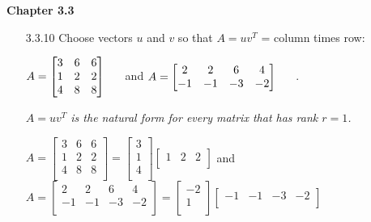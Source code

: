 \documentclass[10pt,twoside,reqno]{article}
\begin{document}
\textbf{Chapter 3.3}
\begin{enumerate}
\item[3.3.10] Choose vectors $u$ and $v$ so that $A = uv^T$ = column times row: \\
\begin{center}
$
$$
A =
\begin{bmatrix}
3&6&6\\
1&2&2\\
4&8&8\\
\end{bmatrix}
\hspace{5mm}
$$
$
and
\hspace{5mm}
$
$$
A = 
\begin{bmatrix}
2&2&6&4\\
-1&-1&-3&-2\\
\end{bmatrix}
\hspace{5mm}
$$
$
. \\
\end{center}
\textit{$A = uv^T$ is the natural form for every matrix that has rank $r = 1$.}
\vspace{3mm}
\begin{center}
$
$$
A =
\begin{bmatrix}
3&6&6\\
1&2&2\\
4&8&8\\
\end{bmatrix}
=
\begin{bmatrix}
3\\
1\\
4\\
\end{bmatrix}
\begin{bmatrix}
1&2&2\\
\end{bmatrix}
$$
$
and
$
$$
A =
\begin{bmatrix}
2&2&6&4\\
-1&-1&-3&-2\\
\end{bmatrix}
=
\begin{bmatrix}
-2\\
1\\
\end{bmatrix}
\begin{bmatrix}
-1&-1&-3&-2\\
\end{bmatrix}
$$
$
\end{center}


\end{enumerate}
\end{document}
